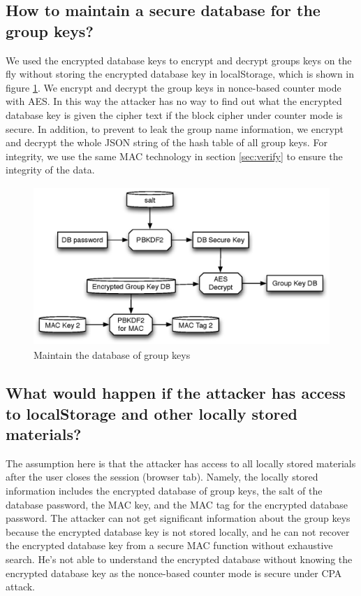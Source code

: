 \subsection{How to maintain a secure database for the group keys?}
We used the encrypted database keys to encrypt and decrypt groups keys on the fly without storing the encrypted database key in localStorage, which is shown in figure \ref{fig:db}. We encrypt and decrypt the group keys in nonce-based counter mode with AES.  In this way the attacker has no way to find out what the encrypted database key is given the cipher text if the block cipher under counter mode is secure. 
In addition, to prevent to leak the group name information, we encrypt and decrypt the whole JSON string of the hash table of all group keys. For integrity, we use the same MAC technology in section \ref{sec:verify} to ensure the integrity of the data.
\begin{figure}[h!]
\centering
\caption{Maintain the database of group keys}
\label{fig:db}
\includegraphics[height=6cm]{fig/db.eps}
\end{figure}

\subsection{What would happen if the attacker has access to localStorage and other locally stored materials? }
The assumption here is that the attacker has access to all locally stored materials after the user closes the session (browser tab). Namely, the locally stored information includes the encrypted database of  group keys, the salt of the database password, the MAC key, and the MAC tag for the encrypted database password. The attacker can not get significant information about the group keys because the encrypted database key is not stored locally, and he can not recover the encrypted database key from a secure MAC function without exhaustive search. He's not able to understand the encrypted database without knowing the encrypted database key as the nonce-based counter mode is secure under CPA attack. 


